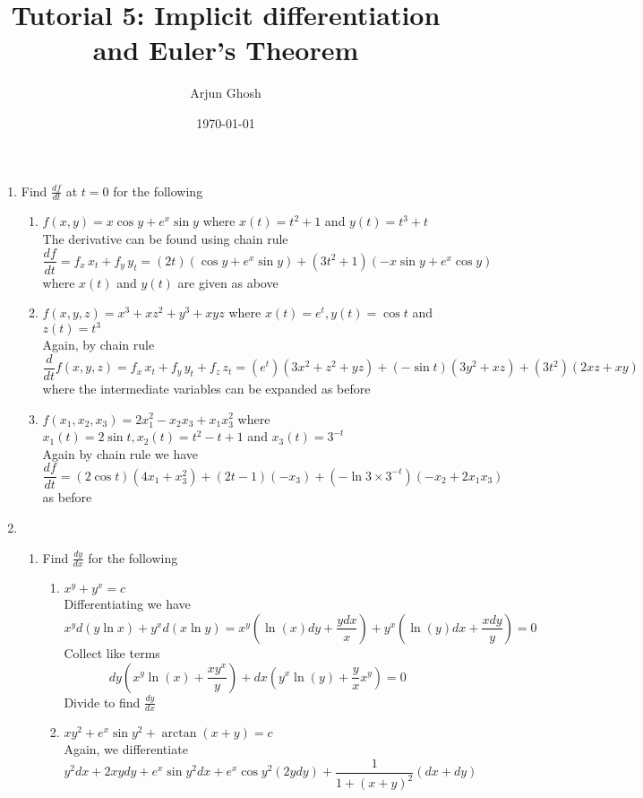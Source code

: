 \documentclass[12pt]{article}
\title{Tutorial 5: Implicit differentiation and Euler's Theorem}
\author{Arjun Ghosh}
\date{\today}
\begin{document}
\maketitle

\begin{enumerate}
\item Find $\frac{df}{dt}$ at $t=0$ for the following
\begin{enumerate}
\item $f(x,y) = x\cos y +  e^{ x }\sin y$ where $x(t) = t^{2} + 1$ and $y(t) = t^{3} + t$ \\
The derivative can be found using chain rule
$$
\frac{df}{dt} = f_{x}\,x_{t} + f_{y}\,y_{t} = (2t)(\cos y + e^{ x }\sin y) + (3t^{2} + 1)(-x\sin y + e^{ x }\cos y)
$$
where $x(t)$ and $y(t)$ are given as above
\item $f(x,y,z) = x^{3} + xz^{2} + y^{3} + xyz$ where $x(t) = e^{ t }, y(t) = \cos t$ and $z(t) = t^{3}$ \\
Again, by chain rule
$$
\frac{d}{dt}f(x,y,z) = f_{x}\, x_{t} + f_{y}\,y_{t} + f_{z}\,z_{t} = (e^{ t })(3x^{2} + z^{2} + yz) + (-\sin t)(3y^{2} + xz) + (3t^{2})(2xz + xy)
$$
where the intermediate variables can be expanded as before
\item $f(x_{1}, x_{2}, x_{3}) = 2x_{1}^{2} - x_{2}x_{3} + x_{1}x_{3}^{2}$ where $x_{1}(t) = 2\sin t, x_{2}(t)=t^{2} -t + 1$ and $x_{3}(t) = 3^{-t}$ \\
Again by chain rule we have
$$
\frac{df}{dt} = (2\cos t)(4x_{1} + x_{3}^{2}) + (2t-1)(-x_{3}) + (-\ln 3 \times 3 ^{-t})(-x_{2} + 2x_{1}x_{3})
$$
as before
\end{enumerate}
\item 
\begin{enumerate}
\item Find $\frac{dy}{dx}$ for the following
\begin{enumerate}
\item $x^{y} + y^{x} = c$ \\
Differentiating we have
$$
x^{y} d(y\ln x) + y^{ x}d(x\ln y) = x^{y} \left( \ln (x)dy + \frac{ydx}{x} \right)  +y^{x} \left( \ln (y)dx + \frac{xdy}{y} \right) = 0
$$
Collect like terms
$$
dy \left( x^{y}\ln(x) + \frac{xy^{x}}{y} \right) + dx\left( y^{x}\ln(y) + \frac{y}{x}x^{y} \right) = 0
$$
Divide to find $\frac{dy}{dx}$
\item $xy^{2} + e^{ x }\sin y^{2} + \arctan (x + y) = c$ \\
Again, we differentiate
$$
y^{2}dx + 2xydy + e^{ x }\sin  y^{2}dx + e^{ x } \cos y^{2} (2ydy) + \frac{1}{1 + (x + y)^{2}} (dx + dy)
$$
\end{enumerate}
\end{enumerate}
\end{enumerate}
\end{document}
